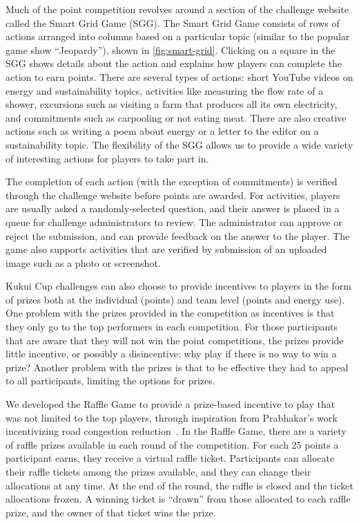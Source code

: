 \documentclass{sigchi}
\begin{document}
Much of the point competition revolves around a section of the challenge website called the Smart Grid Game (SGG). The Smart Grid Game consists of rows of actions arranged into columns based on a particular topic (similar to the popular game show ``Jeopardy''), shown in \autoref{fig:smart-grid}. Clicking on a square in the SGG shows details about the action and explains how players can complete the action to earn points. There are several types of actions: short YouTube videos on energy and sustainability topics, activities like measuring the flow rate of a shower, excursions such as visiting a farm that produces all its own electricity, and commitments such as carpooling or not eating meat. There are also creative actions such as writing a poem about energy or a letter to the editor on a sustainability topic. The flexibility of the SGG allows us to provide a wide variety of interesting actions for players to take part in.

The completion of each action (with the exception of commitments) is verified through the challenge website before points are awarded. For activities, players are usually asked a randomly-selected question, and their answer is placed in a queue for challenge administrators to review. The administrator can approve or reject the submission, and can provide feedback on the answer to the player. The game also supports activities that are verified by submission of an uploaded image such as a photo or screenshot.

Kukui Cup challenges can also choose to provide incentives to players in the form of prizes both at the individual (points) and team level (points and energy use). One problem with the prizes provided in the competition as incentives is that they only go to the top performers in each competition. For those participants that are aware that they will not win the point competitions, the prizes provide little incentive, or possibly a disincentive: why play if there is no way to win a prize? Another problem with the prizes is that to be effective they had to appeal to all participants, limiting the options for prizes.

We developed the Raffle Game to provide a prize-based incentive to play that was not limited to the top players, through inspiration from Prabhakar's work incentivizing road congestion reduction~\cite{Merugu2009}. In the Raffle Game, there are a variety of raffle prizes available in each round of the competition. For each 25 points a participant earns, they receive a virtual raffle ticket. Participants can allocate their raffle tickets among the prizes available, and they can change their allocations at any time. At the end of the round, the raffle is closed and the ticket allocations frozen. A winning ticket is ``drawn'' from those allocated to each raffle prize, and the owner of that ticket wins the prize.
\end{document}
